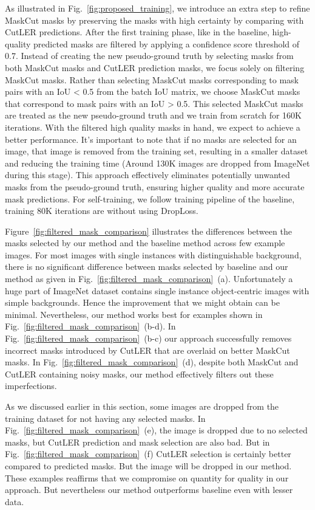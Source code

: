 As illustrated in Fig.~\ref{fig:proposed_training}, we introduce an extra step to refine MaskCut masks by preserving the masks with high certainty by comparing with CutLER predictions. After the first training phase, like in the baseline, high-quality predicted masks are filtered by applying a confidence score threshold of 0.7. Instead of creating the new pseudo-ground truth by selecting masks from both MaskCut masks and CutLER prediction masks, we focus solely on filtering MaskCut masks. Rather than selecting MaskCut masks corresponding to mask pairs with an IoU < 0.5 from the batch IoU matrix, we choose MaskCut masks that correspond to mask pairs with an IoU > 0.5. This selected MaskCut masks are treated as the new pseudo-ground truth and we train from scratch for 160K iterations. With the filtered high quality masks in hand, we expect to achieve a better performance. It’s important to note that if no masks are selected for an image, that image is removed from the training set, resulting in a smaller dataset and reducing the training time (Around 130K images are dropped from ImageNet during this stage). This approach effectively eliminates potentially unwanted masks from the pseudo-ground truth, ensuring higher quality and more accurate mask predictions. For self-training, we follow training pipeline of the baseline, training 80K iterations are without using DropLoss.

Figure~\ref{fig:filtered_mask_comparison} illustrates the differences between the masks selected by our method and the baseline method across few example images. For most images with single instances with distinguishable background, there is no significant difference between masks selected by baseline and our method as given in Fig.~\ref{fig:filtered_mask_comparison}~(a). Unfortunately a huge part of ImageNet dataset contains single instance object-centric images with simple backgrounds. Hence the improvement that we might obtain can be minimal. Nevertheless, our method works best for examples shown in Fig.~\ref{fig:filtered_mask_comparison}~(b-d). In Fig.~\ref{fig:filtered_mask_comparison}~(b-c) our approach successfully removes incorrect masks introduced by CutLER that are overlaid on better MaskCut masks. In Fig.~\ref{fig:filtered_mask_comparison}~(d), despite both MaskCut and CutLER containing noisy masks, our method effectively filters out these imperfections.

As we discussed earlier in this section, some images are dropped from the training dataset for not having any selected masks. In Fig.~\ref{fig:filtered_mask_comparison}~(e), the image is dropped due to no selected masks, but CutLER prediction and mask selection are also bad. But in Fig.~\ref{fig:filtered_mask_comparison}~(f) CutLER selection is certainly better compared to predicted masks. But the image will be dropped in our method. These examples reaffirms that we compromise on quantity for quality in our approach. But nevertheless our method outperforms baseline even with lesser data.

